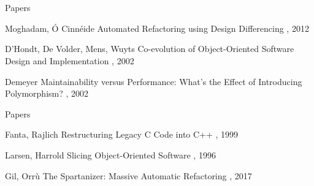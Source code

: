 \documentclass{beamer}
\begin{document}
\appendix
\section*{\appendixname}

\begin{frame}{Papers}
  \begin{thebibliography}{10}
    \beamertemplatearticlebibitems
  
      Moghadam, Ó Cinnéide
      \newblock Automated Refactoring using Design Differencing
      , 2012
    
      D'Hondt, De Volder, Mens, Wuyts
      \newblock Co-evolution of Object-Oriented Software Design and Implementation
      , 2002
      
      Demeyer
      \newblock Maintainability versus Performance: What's the Effect of Introducing Polymorphism?
      , 2002
  \end{thebibliography}
\end{frame}

\begin{frame}{Papers}
  \begin{thebibliography}{10}
    \beamertemplatearticlebibitems
    
      Fanta, Rajlich
      \newblock Restructuring Legacy C Code into C++
      , 1999
      
      Larsen, Harrold
      \newblock Slicing Object-Oriented Software
      , 1996
      
      Gil, Orrù
      \newblock The Spartanizer: Massive Automatic Refactoring
      , 2017
  \end{thebibliography}
\end{frame}
\end{document}
